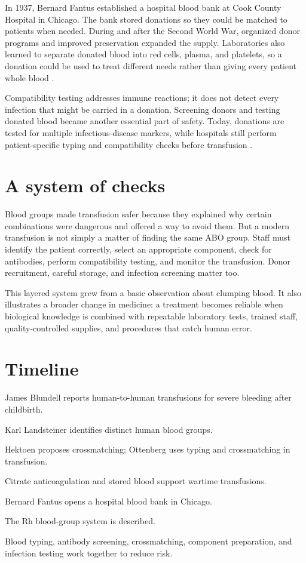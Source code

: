 \documentclass[12pt,oneside]{book}
\begin{document}
In 1937, Bernard Fantus established a hospital blood bank at Cook County
Hospital in Chicago. The bank stored donations so they could be matched to
patients when needed. During and after the Second World War, organized donor
programs and improved preservation expanded the supply. Laboratories also
learned to separate donated blood into red cells, plasma, and platelets, so a
donation could be used to treat different needs rather than giving every
patient whole blood \cite{transfusionBankHistory}.

Compatibility testing addresses immune reactions; it does not detect every
infection that might be carried in a donation. Screening donors and testing
donated blood became another essential part of safety. Today, donations are
tested for multiple infectious-disease markers, while hospitals still perform
patient-specific typing and compatibility checks before transfusion
\cite{cdcBloodTesting}.

\section{A system of checks}
Blood groups made transfusion safer because they explained why certain
combinations were dangerous and offered a way to avoid them. But a modern
transfusion is not simply a matter of finding the same ABO group. Staff must
identify the patient correctly, select an appropriate component, check for
antibodies, perform compatibility testing, and monitor the transfusion.
Donor recruitment, careful storage, and infection screening matter too.

This layered system grew from a basic observation about clumping blood. It
also illustrates a broader change in medicine: a treatment becomes reliable
when biological knowledge is combined with repeatable laboratory tests,
trained staff, quality-controlled supplies, and procedures that catch human
error.

\section*{Timeline}
\begin{description}[leftmargin=2.3cm,style=nextline]
  \item[1818] James Blundell reports human-to-human transfusions for severe bleeding after childbirth.
  \item[1901] Karl Landsteiner identifies distinct human blood groups.
  \item[1907] Hektoen proposes crossmatching; Ottenberg uses typing and crossmatching in transfusion.
  \item[1914--1918] Citrate anticoagulation and stored blood support wartime transfusions.
  \item[1937] Bernard Fantus opens a hospital blood bank in Chicago.
  \item[1939--1940] The Rh blood-group system is described.
  \item[Today] Blood typing, antibody screening, crossmatching, component preparation, and infection testing work together to reduce risk.
\end{description}
\end{document}
